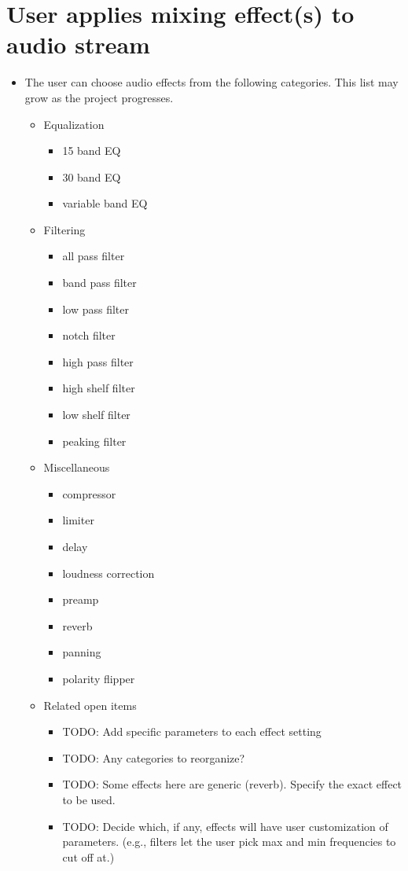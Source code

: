 \section{User applies mixing effect(s) to audio stream}

\begin{itemize}

	\item The user can choose audio effects from the following categories. This list may grow as the project progresses.
	\begin{itemize}
		\item Equalization
		\begin{itemize}
			\item 15 band EQ
			\item 30 band EQ
			\item variable band EQ
		\end{itemize}

		\item Filtering
		\begin{itemize}
			\item all pass filter
			\item band pass filter
			\item low pass filter
			\item notch filter
			\item high pass filter
			\item high shelf filter
			\item low shelf filter
			\item peaking filter
		\end{itemize}

		\item Miscellaneous
		\begin{itemize}
			\item compressor
			\item limiter
			\item delay
			\item loudness correction
			\item preamp
			\item reverb
			\item panning
			\item polarity flipper
		\end{itemize}

		\item Related open items
		\begin{itemize}
			\item TODO: Add specific parameters to each effect setting
			\item TODO: Any categories to reorganize?
			\item TODO: Some effects here are generic (reverb). Specify the exact effect to be used.
			\item TODO: Decide which, if any, effects will have user customization of parameters. (e.g., filters let the user pick max and min frequencies to cut off at.)
		\end{itemize}
	\end{itemize}
	

\end{itemize}
